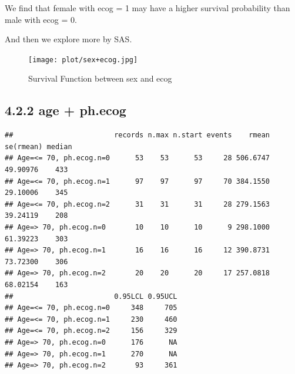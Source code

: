 \documentclass[
]{article}
\newenvironment{Shaded}{\begin{snugshade}}{\end{snugshade}}
\newcommand{\AttributeTok}[1]{\textcolor[rgb]{0.77,0.63,0.00}{#1}}
\newcommand{\CommentTok}[1]{\textcolor[rgb]{0.56,0.35,0.01}{\textit{#1}}}
\newcommand{\DecValTok}[1]{\textcolor[rgb]{0.00,0.00,0.81}{#1}}
\newcommand{\FunctionTok}[1]{\textcolor[rgb]{0.00,0.00,0.00}{#1}}
\newcommand{\NormalTok}[1]{#1}
\newcommand{\OtherTok}[1]{\textcolor[rgb]{0.56,0.35,0.01}{#1}}
\newcommand{\SpecialCharTok}[1]{\textcolor[rgb]{0.00,0.00,0.00}{#1}}
\newcommand{\StringTok}[1]{\textcolor[rgb]{0.31,0.60,0.02}{#1}}
\begin{document}
We find that female with ecog = 1 may have a higher survival probability
than male with ecog = 0.

And then we explore more by SAS.

\begin{figure}
\centering
\texttt{[image: plot/sex+ecog.jpg]}
\caption{Survival Function between sex and ecog}
\end{figure}

\hypertarget{age-ph.ecog}{%
\subsection{4.2.2 age + ph.ecog}\label{age-ph.ecog}}

\begin{Shaded}
\end{Shaded}

\begin{verbatim}
##                        records n.max n.start events    rmean se(rmean) median
## Age=<= 70, ph.ecog.n=0      53    53      53     28 506.6747  49.90976    433
## Age=<= 70, ph.ecog.n=1      97    97      97     70 384.1550  29.10006    345
## Age=<= 70, ph.ecog.n=2      31    31      31     28 279.1563  39.24119    208
## Age=> 70, ph.ecog.n=0       10    10      10      9 298.1000  61.39223    303
## Age=> 70, ph.ecog.n=1       16    16      16     12 390.8731  73.72300    306
## Age=> 70, ph.ecog.n=2       20    20      20     17 257.0818  68.02154    163
##                        0.95LCL 0.95UCL
## Age=<= 70, ph.ecog.n=0     348     705
## Age=<= 70, ph.ecog.n=1     230     460
## Age=<= 70, ph.ecog.n=2     156     329
## Age=> 70, ph.ecog.n=0      176      NA
## Age=> 70, ph.ecog.n=1      270      NA
## Age=> 70, ph.ecog.n=2       93     361
\end{verbatim}
\end{document}
